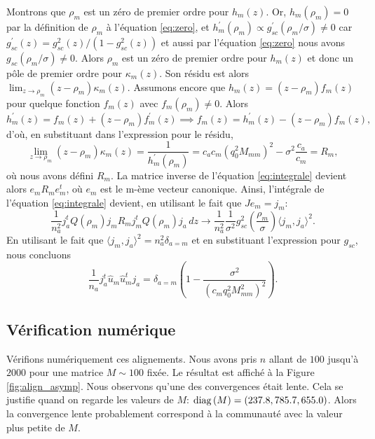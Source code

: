 \documentclass[../../main.tex]{subfiles} %
\begin{document}
Montrons que $\rho_m$ est un zéro de premier ordre pour $h_m(z)$. Or,  $h_m 
\left( \rho_m \right) = 0$ par la définition de $\rho_m$ à l'équation 
\ref{eq:zero}, et $h_m^\prime \left( \rho_m \right) \propto g_{sc}^\prime 
\left( \rho_m / \sigma \right) \neq 0$ car $g_{sc}^\prime (z) = g_{sc}^2(z)/
\left( 1 - g_{sc}^2(z) \right)$ et aussi par l'équation \ref{eq:zero} nous avons 
$g_{sc} \left( \rho_m / \sigma \right) \neq 0$. Alors $\rho_m$ est un zéro de 
premier ordre pour $h_m (z)$ et donc un pôle de premier ordre pour $\kappa_m (z)$. 
Son résidu est alors $\lim_{z \to \rho_m} \left( z - \rho_m \right) \kappa_m (z)$. 
Assumons encore que $h_m(z) = \left( z - \rho_m \right) f_m(z)$ pour quelque 
fonction $f_m(z)$ avec $f_m \left( \rho_m \right) \neq 0$. Alors
\begin{equation*}
	h_m^\prime (z) = f_m(z) + \left( z - \rho_m \right) f_m^\prime (z) 
	\implies f_m(z) = h_m^\prime(z) - \left( z - \rho_m \right) f_m(z),	
\end{equation*}
d'où, en substituant dans l'expression pour le résidu,
\begin{equation*}
	\lim_{z \to \rho_m} \left(z - \rho_m \right) \kappa_m (z) 
	= \frac{1}{h_m^\prime \left( \rho_m \right)} = c_a c_m 
	\left( q_0^2 M_{mm} \right)^2 - \sigma^2 \frac{c_a}{c_m} = R_m,
\end{equation*}
où nous avons défini $R_m$. La matrice inverse de l'équation \ref{eq:integrale} 
devient alors $e_m R_m e_m^t$, où $e_m$ est le m-ème vecteur canonique. Ainsi, 
l'intégrale de l'équation \ref{eq:integrale} devient, en utilisant le fait que 
$J e_m = j_m$:
\begin{equation*}
	\frac{1}{n_a^2} j_a^t Q(\rho_m) j_m R_m j_m^t Q(\rho_m) j_a \, dz \to 
	\frac{1}{n_a^2} \frac{1}{\sigma^2} g_{sc}^2 \left( \frac{\rho_m}{\sigma} 
	\right) \langle j_m, j_a \rangle^2.
\end{equation*}
En utilisant le fait que $\langle j_m, j_a \rangle^2 = n_a^2 \delta_{a=m}$ et 
en substituant l'expression pour $g_{sc}$, nous concluons
\begin{equation*}
	\frac{1}{n_a} j_a^t \hat u_m \hat u_m^t j_a = \delta_{a=m} \left( 1 - 
	\frac{\sigma^2}{\left( c_m q_0^2 M_{mm}^2 \right)^2} \right).
\end{equation*}

\subsection{Vérification numérique}
Vérifions numériquement ces alignements. Nous avons pris $n$ allant de $100$ 
jusqu'à $2000$ pour une matrice $M \sim 100$ fixée. Le résultat est affiché à 
la Figure \ref{fig:align_asymp}. Nous observons qu'une des convergences était 
lente. Cela se justifie quand on regarde les valeurs de $M$: $\operatorname{diag} \left( M \right) = 
\left( 237.8, 785.7, 655.0 \right)$. Alors la convergence lente probablement 
correspond à la communauté avec la valeur plus petite de $M$.
\end{document}
